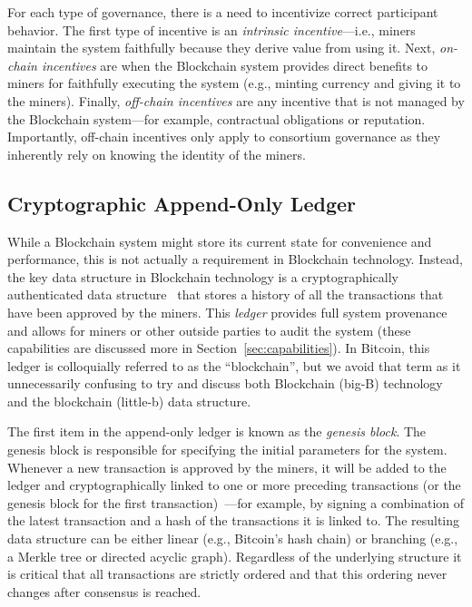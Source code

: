 For each type of governance, there is a need to incentivize correct participant behavior.
The first type of incentive is an \emph{intrinsic incentive}---i.e., miners maintain the system faithfully because they derive value from using it.
Next, \emph{on-chain incentives} are when the Blockchain system provides direct benefits to miners for faithfully executing the system (e.g., minting currency and giving it to the miners).
Finally, \emph{off-chain incentives} are any incentive that is not managed by the Blockchain system---for example, contractual obligations or reputation.
Importantly, off-chain incentives only apply to consortium governance as they inherently rely on knowing the identity of the miners.

\subsection{Cryptographic Append-Only Ledger}
While a Blockchain system might store its current state for convenience and performance, this is not actually a requirement in Blockchain technology.
Instead, the key data structure in Blockchain technology is a cryptographically authenticated data structure~\cite{tamassia2003authenticated} that stores a history of all the transactions that have been approved by the miners.
This \emph{ledger} provides full system provenance and allows for miners or other outside parties to audit the system (these capabilities are discussed more in Section~\ref{sec:capabilities}).
In Bitcoin, this ledger is colloquially referred to as the ``blockchain'', but we avoid that term as it unnecessarily confusing to try and discuss both Blockchain (big-B) technology and the blockchain (little-b) data structure.

The first item in the append-only ledger is known as the \emph{genesis block}.
The genesis block is responsible for specifying the initial parameters for the system.
Whenever a new transaction is approved by the miners, it will be added to the ledger and cryptographically linked to one or more preceding transactions (or the genesis block for the first transaction)~\cite{bayer1993improving,haber1990time,haber1997secure}---for example, by signing a combination of the latest transaction and a hash of the transactions it is linked to.
The resulting data structure can be either linear (e.g., Bitcoin's hash chain) or branching (e.g., a Merkle tree or directed acyclic graph).
Regardless of the underlying structure it is critical that all transactions are strictly ordered and that this ordering never changes after consensus is reached.

